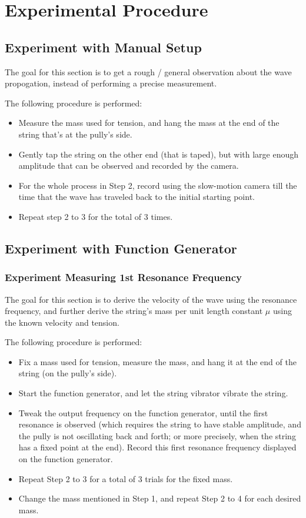\documentclass{article}
\begin{document}
\section{Experimental Procedure}
\subsection{Experiment with Manual Setup}
The goal for this section is to get a rough / general observation about the wave propogation, instead of performing a precise measurement.

The following procedure is performed:
\begin{itemize}
    \item[1.] Measure the mass used for tension, and hang the mass at the end of the string that's at the pully's side.
    \item[2.] Gently tap the string on the other end (that is taped), but with large enough amplitude that can be observed and recorded by the camera.
    \item[3.] For the whole process in Step 2, record using the slow-motion camera till the time that the wave has traveled back to the initial starting point.
    \item[4.] Repeat step 2 to 3 for the total of 3 times.   
\end{itemize}

\hfil
\subsection{Experiment with Function Generator}
\subsubsection{Experiment Measuring 1st Resonance Frequency}
The goal for this section is to derive the velocity of the wave using the resonance frequency, and further derive the string's mass per unit length constant $\mu$ using the known velocity and tension.

The following procedure is performed:
\begin{itemize}
    \item[1.] Fix a mass used for tension, measure the mass, and hang it at the end of the string (on the pully's side).
    \item[2.] Start the function generator, and let the string vibrator vibrate the string.
    \item[3.] Tweak the output frequency on the function generator, until the first resonance is observed (which requires the string to have stable amplitude, and the pully is not oscillating back and forth; or more precisely, when the string has a fixed point at the end). Record this first resonance frequency displayed on the function generator.
    \item[4.] Repeat Step 2 to 3 for a total of 3 trials for the fixed mass.
    \item[5.] Change the mass mentioned in Step 1, and repeat Step 2 to 4 for each desired mass.
\end{itemize}
\end{document}
